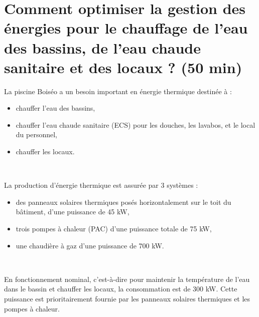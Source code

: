 
\newpage

\section{Comment optimiser la gestion des énergies pour le chauffage de l'eau des bassins, de l'eau chaude sanitaire et des locaux ? (50 min)}

La piscine Boiséo a un besoin important en énergie thermique destinée à :
\begin{itemize}
 \item chauffer l'eau des bassins,
 \item chauffer l'eau chaude sanitaire (ECS) pour les douches, les lavabos, et le local du personnel,
 \item chauffer les locaux.
\end{itemize}



~\

La production d'énergie thermique est assurée par 3 systèmes :
\begin{itemize}
 \item des panneaux solaires thermiques posés horizontalement sur le toit du bâtiment, d'une puissance de 45 kW,
 \item trois pompes à chaleur (PAC) d'une puissance totale de 75 kW,
 \item une chaudière à gaz d'une puissance de 700 kW.
\end{itemize}


~\

En fonctionnement nominal, c'est-à-dire pour maintenir la température de l'eau dans le bassin et chauffer les locaux, la consommation est de 300 kW. Cette puissance est prioritairement fournie par les panneaux solaires thermiques et les pompes à chaleur.

